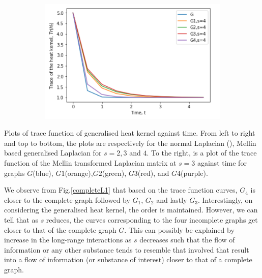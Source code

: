 \documentclass[10pt,a4paper]{article}
\begin{document}
\begin{figure}[H]
\begin{subfigure}[b]{0.45\textwidth}
         		\caption{}
         		\label{completeMellins3}
         	\end{subfigure}~
         	\begin{subfigure}[b]{0.45\textwidth}
         		\includegraphics[width= \textwidth]{images/s4-graphcomp.png}
         		\caption{}
         		\label{completeMellins4}
         	\end{subfigure}
         \end{figure}
         Plots of trace function of generalised heat kernel against time.  From left to right and top to bottom, the plots are respectively for the normal Laplacian (), Mellin based generalised Laplacian for $s=2,3$ and $4$.  To the right, is a plot of the trace function of the Mellin transformed Laplacian matrix at $s=3$ against time for graphs $G$(blue), $G1$(orange),$G2$(green), $G3$(red), and $G4$(purple).
         
         
         We observe from Fig.\ref{completeL1} that based on the trace function curves, $G_4$ is closer to the complete graph followed by $G_1$, $G_2$ and lastly $G_3$. Interestingly, on considering the generalised heat kernel, the order is maintained. However, we can tell that as $s$ reduces, the curves corresponding to the four incomplete graphs get closer to that of the complete graph $G$. This can possibly be explained by increase in the long-range interactions as $s$ decreases such that the flow of information or any other substance tends to resemble that  involved that result into a flow of information (or substance of interest) closer to that of a complete graph.
        
\end{document}
